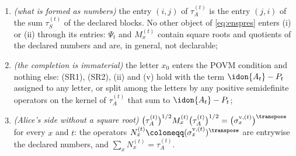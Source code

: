 \begin{lemma}
\begin{enumerate}[label=(\roman*),leftmargin=2.2em]
\item \emph{(what is formed as numbers)} the entry $(i,j)$ of
$\tau^{(t)}_A$ is the entry $(j,i)$ of the sum $\tau^{(t)}_S$ of the
declared blocks. No
other object of \eqref{eq:enspres} enters (i) or (ii) through its entries:
$\Psi_t$ and $M^{(t)}_x$ contain square roots and quotients of the declared
numbers and are, in general, not declarable;
\item \emph{(the completion is immaterial)} the letter $x_0$ enters the
POVM condition and nothing else: (SR1), (SR2), (ii) and (v) hold with the
term $\idon{A_t}-P_t$ assigned to any letter, or split among the letters by
any positive semidefinite operators on the kernel of $\tau^{(t)}_A$ that
sum to $\idon{A_t}-P_t$;
\item \emph{(Alice's side without a square root)}
$\big(\tau^{(t)}_A\big)^{1/2}M^{(t)}_x\big(\tau^{(t)}_A\big)^{1/2}
=\big(\sigma^{\mathrm v,(t)}_x\big)^{\transpose}$ for every $x$ and $t$: the
operators $N^{(t)}_x\coloneqq(\sigma^{\mathrm v,(t)}_x)^{\transpose}$ are
entrywise the declared numbers, and
$\sum_xN^{(t)}_x=\tau^{(t)}_A$.
\end{enumerate}
\end{lemma}

